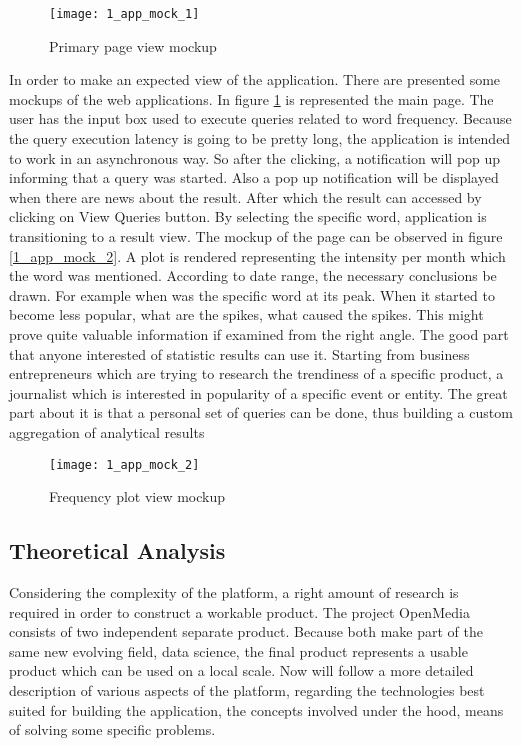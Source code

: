 \begin{figure}[!ht]
\centering
\texttt{[image: 1\_app\_mock\_1]}
\caption{Primary page view mockup}\label{app_mock_1}
\end{figure}

In order to make an expected view of the application. There are presented some mockups of the web applications. In figure \ref{app_mock_1} is represented the main page. The user has the input box used to execute queries related to word frequency. Because the query execution latency is going to be pretty long, the application is intended to work in an asynchronous way. So after the clicking, a notification will pop up informing that a query was started. Also a pop up notification will be displayed when there are news about the result. After which the result can accessed by clicking on View Queries button. By selecting the specific word, application is transitioning to a result view. The mockup of the page can be observed in figure \ref{1_app_mock_2}. A  plot is rendered representing the intensity per month which the word was mentioned. According to date range, the necessary conclusions be drawn. For example when was the specific word at its peak. When it started to become less popular, what are the spikes, what caused the spikes. This might prove quite valuable information if examined from the right angle. The good part that anyone interested of statistic results can use it. Starting from business entrepreneurs which are trying to research the trendiness of a specific product, a journalist which is interested in popularity of a specific event or entity. The great part about it is that a personal set of queries can be done, thus building a custom aggregation of analytical results

\begin{figure}[!ht]
\centering
\texttt{[image: 1\_app\_mock\_2]}
\caption{Frequency plot view mockup}\label{app_mock_2}
\end{figure}

\subsection{Theoretical Analysis}
Considering the complexity of the platform, a right amount of research is required in order to construct a workable product. The project OpenMedia consists of two independent separate product. Because both make part of the same new evolving field, data science, the final product represents a usable product which can be used on a local scale. Now will follow a more detailed description of various aspects of the platform, regarding the technologies best suited for building the application, the concepts involved under the hood, means of solving some specific problems.


